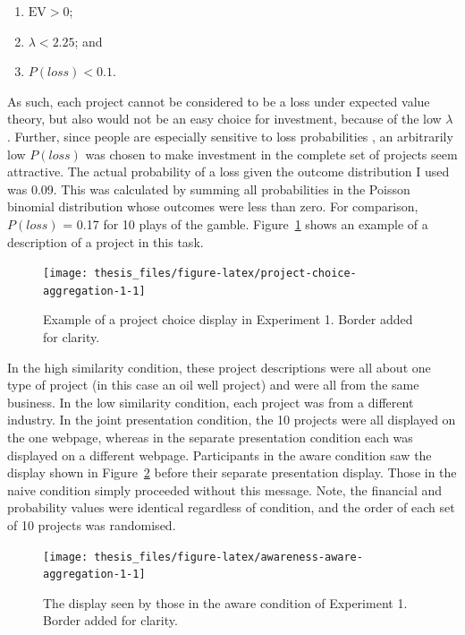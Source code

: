 \documentclass[a4paper, nobind, dvipsnames]{templates/ociamthesis}
\theoremstyle{definition}
\theoremstyle{definition}
\theoremstyle{definition}
\theoremstyle{definition}
\theoremstyle{remark}
\begin{document}
\begin{enumerate}
\def\labelenumi{\arabic{enumi}.}
\item
  \(\text{EV} > 0\);
\item
  \(\lambda < 2.25\); and
\item
  \(P(loss) < 0.1\).
\end{enumerate}

As such, each project cannot be considered to be a loss under expected value
theory, but also would not be an easy choice for investment, because of the low
\(\lambda\) \autocite[made to be lower than the median loss aversion coefficient calculated
in][]{tversky1992}. Further, since people are especially sensitive to loss
probabilities \autocite{zeisberger2020,kahneman1979}, an arbitrarily low \(P(loss)\) was
chosen to make investment in the complete set of projects seem attractive. The
actual probability of a loss given the outcome distribution I used was
0.09. This was calculated by summing all
probabilities in the Poisson binomial distribution whose outcomes were less than
zero. For comparison, \(P(loss)\) =
0.17 for 10 plays of the \textcite{samuelson1963}
gamble. Figure~\ref{fig:project-choice-aggregation-1} shows an example of a
description of a project in this task.



\begin{figure}
\texttt{[image: thesis\_files/figure-latex/project-choice-aggregation-1-1]} \caption{Example of a project choice display in Experiment 1. Border added for clarity.}\label{fig:project-choice-aggregation-1}
\end{figure}

In the high similarity condition, these project descriptions were all about one
type of project (in this case an oil well project) and were all from the same
business. In the low similarity condition, each project was from a different
industry. In the joint presentation condition, the 10 projects were all
displayed on the one webpage, whereas in the separate presentation condition
each was displayed on a different webpage. Participants in the aware condition
saw the display shown in Figure~\ref{fig:awareness-aware-aggregation-1} before
their separate presentation display. Those in the naive condition simply
proceeded without this message. Note, the financial and probability values were
identical regardless of condition, and the order of each set of 10 projects was
randomised.



\begin{figure}
\texttt{[image: thesis\_files/figure-latex/awareness-aware-aggregation-1-1]} \caption{The display seen by those in the aware condition of Experiment 1. Border added for clarity.}\label{fig:awareness-aware-aggregation-1}
\end{figure}
\end{document}
